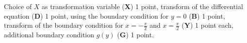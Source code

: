 \begin{bewertung}
Choice of $X$ as transformation variable ({\bf X}) 1 point,
transform of the differential equation ({\bf D}) 1 point,
using the boundary condition for $y=0$ ({\bf B}) 1 point,
transform of the boundary condition for $x=-\frac{\pi}2$
and $x=\frac{\pi}2$ ({\bf Y}) 1 point each,
additional boundary condition $g(y)$ ({\bf G}) 1 point.
\end{bewertung}

